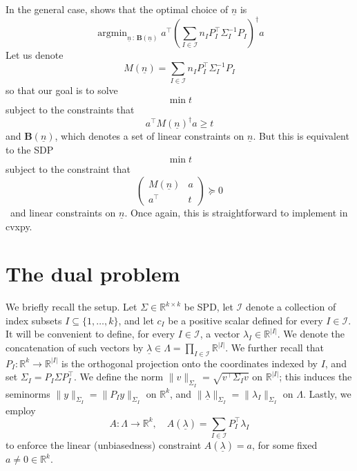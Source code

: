 \documentclass{article} %
\newcommand{\R}{\mathbb{R}}
\DeclareMathOperator{\argmin}{argmin}
\begin{document}
In the general case,  shows that the optimal choice of $\underline{n}$ is
\[
\argmin_{\underline{n}\,:\,\mathbf{B}(\underline{n})} a^\top\left(\sum_{I\in\mathcal{I}} n_I P_I^\top \Sigma_I^{-1} P_I\right)^\dagger a
\]
Let us denote
\[
M(\underline{n}) = \sum_{I\in\mathcal{I}} n_IP_I^\top \Sigma_I^{-1}P_I
\]
so that our goal is to solve
\[
\min t
\]
subject to the constraints that
\[
a^\top M(\underline{n})^\dagger a \geq t
\]
and $\mathbf{B}(\underline{n})$, which denotes a set of linear constraints on $\underline{n}$. But this is equivalent to the SDP
\[
\min t
\]
subject to the constraint that
\[
\begin{pmatrix}
    M(\underline{n}) & a \\
    a^\top & t 
\end{pmatrix}\succeq0
\]\
and linear constraints on $\underline{n}$. Once again, this is straightforward to implement in cvxpy.
\section{The dual problem}\label{sec:dual}
We briefly recall the setup. Let $\Sigma\in\R^{k\times k}$ be SPD, let $\mathcal{I}$ denote a collection of index subsets $I\subseteq \{1,\dots,k\}$, and let $c_I$ be a positive scalar defined for every $I\in\mathcal{I}$. It will be convenient to define, for every $I\in\mathcal{I}$, a vector $\lambda_I\in\R^{|I|}$. We denote the concatenation of such vectors by $\underline{\lambda}\in\Lambda = \prod_{I\in\mathcal{I}} \R^{|I|}$. We further recall that $P_I:\R^k\longrightarrow\R^{|I|}$ is the orthogonal projection onto the coordinates indexed by $I$, and set $\Sigma_I=P_I\Sigma P_I^\top$. We define the norm $\|v\|_{\Sigma_I}=\sqrt{v^\top\Sigma_I v}$ on $\R^{|I|}$; this induces the seminorms $\|y\|_{\Sigma_I}=\|P_Iy\|_{\Sigma_I}$ on $\R^k$, and $\|\underline{\lambda}\|_{\Sigma_I}=\|\lambda_I\|_{\Sigma_I}$ on $\Lambda$. Lastly, we employ
\[
A:\Lambda\rightarrow\R^k,\quad A(\underline{\lambda}) = \sum_{I\in\mathcal{I}} P_I^\top \lambda_I
\]
to enforce the linear (unbiasedness) constraint $A(\underline{\lambda})=a$, for some fixed $a\neq0\in\R^k$.
\end{document}
